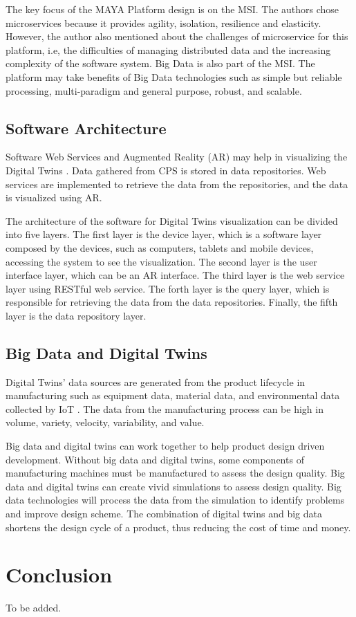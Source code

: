 \documentclass[article]{aaltoseries}
\begin{document}
The key focus of the MAYA Platform design is on the MSI. The authors chose microservices because it provides agility, isolation, resilience and elasticity. However, the author also mentioned about the challenges of microservice for this platform, i.e, the difficulties of managing distributed data and the increasing complexity of the software system. Big Data is also part of the MSI. The platform may take benefits of Big Data technologies such as simple but reliable processing, multi-paradigm and general purpose, robust, and scalable.

\subsection{Software Architecture}
Software Web Services and Augmented Reality (AR) may help in visualizing the Digital Twins \cite{schroeder2016visualising}. Data gathered from CPS is stored in data repositories. Web services are implemented to retrieve the data from the repositories, and the data is visualized using AR.

The architecture of the software for Digital Twins visualization can be divided into five layers. The first layer is the device layer, which is a software layer composed by the devices, such as computers, tablets and mobile devices, accessing the system to see the visualization. The second layer is the user interface layer, which can be an AR interface. The third layer is the web service layer using RESTful web service. The forth layer is the query layer, which is responsible for retrieving the data from the data repositories. Finally, the fifth layer is the data repository layer.

\subsection{Big Data and Digital Twins}
Digital Twins' data sources are generated from the product lifecycle in manufacturing such as equipment data, material data, and environmental data collected by IoT \cite{TAO2019183}. The data from the manufacturing process can be high in volume, variety, velocity, variability, and value.

Big data and digital twins can work together to help product design driven development. Without big data and digital twins, some components of manufacturing machines must be manufactured to assess the design quality. Big data and digital twins can create vivid simulations to assess design quality. Big data technologies will process the data from the simulation to identify problems and improve design scheme. The combination of digital twins and big data shortens the design cycle of a product, thus reducing the cost of time and money.





\section{Conclusion}

To be added.






\end{document}
